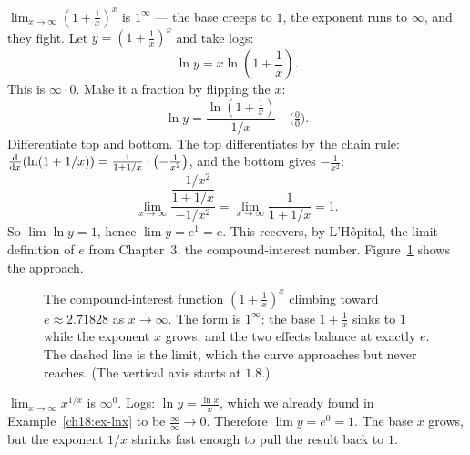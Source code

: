 \begin{example}\label{ch18:ex-e}
$\displaystyle\lim_{x\to\infty}\left(1+\frac{1}{x}\right)^{x}$ is $1^{\infty}$ --- the
base creeps to $1$, the exponent runs to $\infty$, and they fight. Let
$y=\left(1+\tfrac1x\right)^{x}$ and take logs:
\[
\ln y=x\ln\!\left(1+\frac1x\right).
\]
This is $\infty\cdot 0$. Make it a fraction by flipping the $x$:
\[
\ln y=\frac{\ln\!\left(1+\tfrac1x\right)}{1/x}\quad\Big(\tfrac00\Big).
\]
Differentiate top and bottom. The top differentiates by the chain rule:
$\frac{\mathrm{d}}{\mathrm{d} x}\!\left(\ln(1+1/x)\right)=\frac{1}{1+1/x}\cdot\left(-\tfrac{1}{x^2}\right)$, and the bottom
gives $-\tfrac{1}{x^2}$:
\[
\lim_{x\to\infty}\frac{\dfrac{-1/x^2}{1+1/x}}{-1/x^2}
=\lim_{x\to\infty}\frac{1}{1+1/x}=1.
\]
So $\lim \ln y=1$, hence $\lim y=e^{1}=e$. This recovers, by L'H\^opital, the
limit definition of $e$ from Chapter~3, the compound-interest number.
Figure~\ref{ch18:fig-e} shows the approach.
\end{example}

\begin{figure}[H]
\centering
{}
\caption{The compound-interest function $\left(1+\tfrac1x\right)^x$ climbing toward
$e\approx 2.71828$ as $x\to\infty$. The form is $1^\infty$: the base $1+\tfrac1x$
sinks to $1$ while the exponent $x$ grows, and the two effects balance at exactly
$e$. The dashed line is the limit, which the curve approaches but never reaches.
(The vertical axis starts at $1.8$.)}
\label{ch18:fig-e}
\end{figure}

\begin{example}[An $\infty^{0}$]\label{ch18:ex-inf0}
$\displaystyle\lim_{x\to\infty}x^{1/x}$ is $\infty^{0}$. Logs:
$\ln y=\tfrac{\ln x}{x}$, which we already found in Example~\ref{ch18:ex-lnx} to
be $\tfrac{\infty}{\infty}\to 0$. Therefore $\lim y=e^{0}=1$. The base $x$ grows, but
the exponent $1/x$ shrinks fast enough to pull the result back to $1$.
\end{example}

